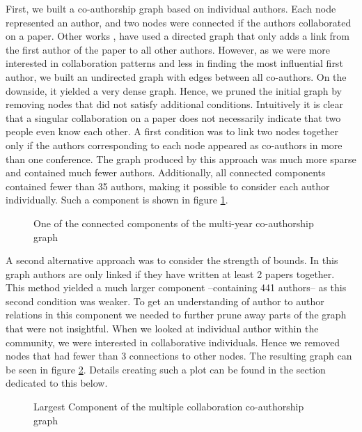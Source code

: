 \documentclass[article,twocolumn]{IEEEtran}
\begin{document}
First, we built a co-authorship graph based on individual authors. Each
node represented an author, and two nodes were connected if the authors
collaborated on a paper. Other works \cite{cheong2009social},
\cite{hesford2006management} have used a directed graph that only adds a
link from the first author of the paper to all other authors. However,
as we were more interested in collaboration patterns and less in finding
the most influential first author, we built an undirected graph with
edges between all co-authors. On the downside, it yielded a very dense
graph. Hence, we pruned the initial graph by removing nodes that did not
satisfy additional conditions. Intuitively it is clear that a singular
collaboration on a paper does not necessarily indicate that two people
even know each other. A first condition was to link two nodes together
only if the authors corresponding to each node appeared as co-authors in
more than one conference. The graph produced by this approach was much
more sparse and contained much fewer authors. Additionally, all
connected components contained fewer than 35 authors, making it possible
to consider each author individually. Such a component is shown in
figure \ref{fig_plot}.


    \begin{figure}
        \begin{center}\end{center}
        \caption{One of the connected components of the multi-year co-authorship graph}
        \label{fig_plot}
    \end{figure}
    
    A second alternative approach was to consider the strength of bounds. In
this graph authors are only linked if they have written at least 2
papers together. This method yielded a much larger component
--containing 441 authors-- as this second condition was weaker. To get
an understanding of author to author relations in this component we
needed to further prune away parts of the graph that were not
insightful. When we looked at individual author within the community, we
were interested in collaborative individuals. Hence we removed nodes
that had fewer than 3 connections to other nodes. The resulting graph
can be seen in figure \ref{author_collab_large}. Details creating such a
plot can be found in the section dedicated to this below.


    \begin{figure}
        \begin{center}\end{center}
        \caption{Largest Component of the multiple collaboration co-authorship graph}
        \label{author_collab_large}
    \end{figure}
    
\end{document}
